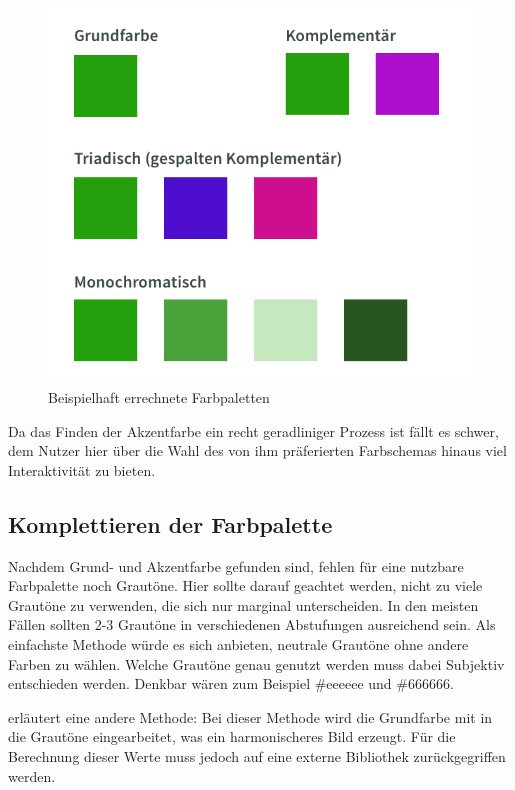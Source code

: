 \begin{figure}[h]
    \centering
    \includegraphics[width=1\textwidth]{images/color-schemes.png}
    \caption{Beispielhaft errechnete Farbpaletten}
    \label{fig:color-schemes}
\end{figure}

Da das Finden der Akzentfarbe ein recht geradliniger Prozess ist fällt es schwer, dem Nutzer hier über die Wahl des von ihm präferierten Farbschemas hinaus viel Interaktivität zu bieten.

\subsection{Komplettieren der Farbpalette}

Nachdem Grund- und Akzentfarbe gefunden sind, fehlen für eine nutzbare Farbpalette noch Grautöne.  Hier sollte darauf geachtet werden, nicht zu viele Grautöne zu verwenden, die sich nur marginal unterscheiden. In den meisten Fällen sollten 2-3 Grautöne in verschiedenen Abstufungen ausreichend sein.
Als einfachste Methode würde es sich anbieten, neutrale Grautöne ohne andere Farben zu wählen. Welche Grautöne genau genutzt werden muss dabei Subjektiv entschieden werden. Denkbar wären zum Beispiel \#eeeeee und \#666666.

\cite{elizabeth2016simple} erläutert eine andere Methode: Bei dieser Methode wird die Grundfarbe mit in die Grautöne eingearbeitet, was ein harmonischeres Bild erzeugt.  Für die Berechnung dieser Werte muss jedoch auf eine externe Bibliothek zurückgegriffen werden.

